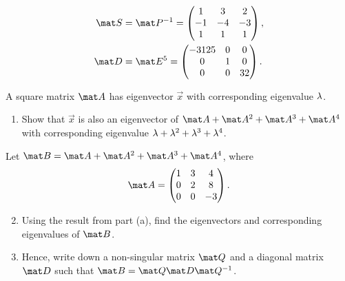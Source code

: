 \begin{solution}
\begin{ppart}
\begin{psubpart}
\begin{align*}
                \mat S &= \mat P^{-1} = \begin{pmatrix}1 & 3 & 2 \\ -1 & -4 & -3 \\ 1 & 1 & 1\end{pmatrix},\\
                \mat D &= \mat E^5 = \begin{pmatrix}-3125 & 0 & 0 \\ 0 & 1 & 0 \\ 0 & 0 & 32\end{pmatrix}.
            \end{align*}
        \end{psubpart}
    \end{ppart}
\end{solution}

\clearpage
\begin{problem}
    A square matrix $\mat A$ has eigenvector $\vec x$ with corresponding eigenvalue $\lambda$.

    \begin{enumerate}
        \item Show that $\vec x$ is also an eigenvector of $\mat A + \mat A^2 + \mat A^3 + \mat A^4$ with corresponding eigenvalue $\lambda + \lambda^2 + \lambda^3 + \lambda^4$.
    \end{enumerate}

    Let $\mat B = \mat A + \mat A^2 + \mat A^3 + \mat A^4$, where \[\mat A = \begin{pmatrix}1 & 3 & 4 \\ 0 & 2 & 8 \\ 0 & 0 & -3\end{pmatrix}.\]

    \begin{enumerate}
        \setcounter{enumi}{1}
        \item Using the result from part (a), find the eigenvectors and corresponding eigenvalues of $\mat B$.
        \item Hence, write down a non-singular matrix $\mat Q$ and a diagonal matrix $\mat D$ such that $\mat B = \mat Q \mat D \mat Q^{-1}$.
    \end{enumerate}
\end{problem}
